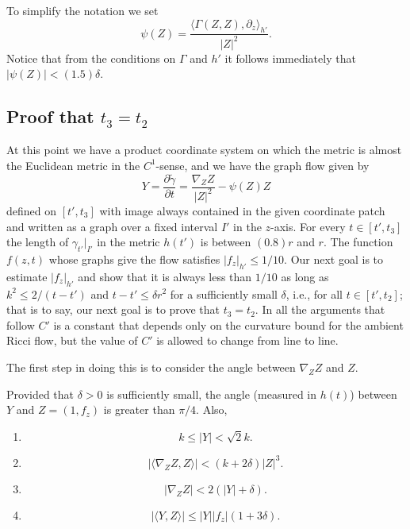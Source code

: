 To simplify the notation we set
$$\psi(Z)=\frac{\langle\Gamma(Z,Z),\partial_z\rangle_{h'}}{|Z|^2}.$$
Notice that from the conditions on $\Gamma$ and $h'$ it follows
immediately that $|\psi(Z)|<(1.5)\delta$.

\subsection{Proof that $t_3=t_2$}

At this point we have a product coordinate system on which the
metric is almost the Euclidean metric in the $C^1$-sense, and we
have the graph flow given by
$$Y=\frac{\partial\widetilde \gamma}{\partial
t}=\frac{\nabla_ZZ}{|Z|^2}-\psi(Z)Z$$ defined on $[t',t_3]$ with
image always contained in the given coordinate patch and written as
a graph over a fixed interval $I'$ in the $z$-axis. For every $t\in
[t',t_3]$ the length of $\gamma_{t'}|_{I'}$ in the metric $h(t')$ is
between $(0.8)r$ and $r$. The function $f(z,t)$ whose graphs give
the flow satisfies $|f_z|_{h'}\le 1/10$. Our next goal is to
estimate $|f_z|_{h'}$ and show that it is always less than  $1/10$
as long as $k^2\le 2/(t-t')$ and $t-t'\le \delta r^2$ for a
sufficiently small $\delta$, i.e., for all $t\in [t',t_2]$; that is
to say, our next goal is to prove that $t_3=t_2$. In all the
arguments that follow $C'$ is a constant that depends only on the
curvature bound for the ambient Ricci flow, but the value of $C'$ is
allowed to change from line to line.


The first step in doing this is to consider the angle between
$\nabla_ZZ$ and $Z$.

\begin{claim}
\label{claim:graph-flow-angle-and-norm-bounds}
\label{1891}
Provided that $\delta>0$ is sufficiently small,
the angle (measured in $h(t)$) between $Y$ and $Z=(1,f_z)$ is
greater than $\pi/4$. Also,
\begin{enumerate}
\item[(1)] $$k\le |Y|<\sqrt{2}k.$$
\item[(2)] $$\left|\langle \nabla_ZZ,Z\rangle\right|<(k+ 2\delta) |Z|^3.$$
\item[(3)] $$\left|\nabla_ZZ\right|<2(|Y|+\delta).$$
\item[(4)] $$|\langle Y,Z\rangle |\le |Y||f_z|(1+3\delta).$$
\end{enumerate}
\end{claim}

